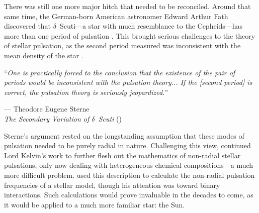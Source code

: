 There was still one more major hitch that needed to be reconciled. 
Around that same time, the German-born American astronomer Edward Arthur Fath discovered that $\delta$~Scuti---a star with much resemblance to the Cepheids---has more than one period of pulsation \citep{fath1935photometric}. 
This brought serious challenges to the theory of stellar pulsation, as the second period measured was inconsistent with the mean density of the star \citep{1938ApJ....87..133S,1940PNAS...26..537S}. 
\epigraph{``\emph{One is practically forced to the conclusion that the existence of the pair of periods \hphantom{``}would be inconsistent with the pulsation theory... If the [second period] is correct, \hphantom{``}the pulsation theory is seriously jeopardized.}''}{--- Theodore Eugene Sterne\\\textit{The Secondary Variation of $\delta$~Scuti} (\citeyear{1938ApJ....87..133S})}

Sterne's argument rested on the longstanding assumption that these modes of pulsation needed to be purely radial in nature. 
Challenging this view, \citet{1938ApJ....88..189P} continued Lord Kelvin's work to further flesh out the mathematics of non-radial stellar pulsations, only now dealing with heterogeneous chemical compositions---a much more difficult problem. 
\citet{1941MNRAS.101..367C} used this description to calculate the non-radial pulsation frequencies of a stellar model, though his attention was toward binary interactions. %
Such calculations would prove invaluable in the decades to come, as it would be applied to a much more familiar star: the Sun. %



